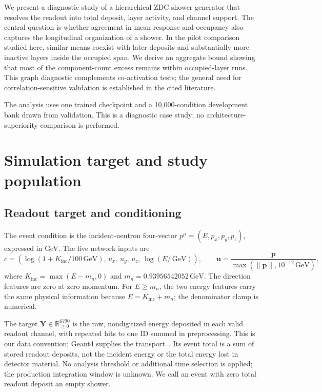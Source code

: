 \documentclass[11pt]{article}
\newcommand{\GeV}{\,\mathrm{GeV}}
\newcommand{\Kinc}{K_{\mathrm{inc}}}
\newcommand{\Y}{\mathbf{Y}}
\begin{document}
We present a diagnostic study of a hierarchical ZDC shower generator that resolves the readout into total deposit, layer activity, and channel support. The central question is whether agreement in mean response and occupancy also captures the longitudinal organization of a shower. In the pilot comparison studied here, similar means coexist with later deposits and substantially more inactive layers inside the occupied span. We derive an aggregate bound showing that most of the component-count excess remains within occupied-layer runs. This graph diagnostic complements co-activation tests; the general need for correlation-sensitive validation is established in the cited literature.

The analysis uses one trained checkpoint and a 10,000-condition development bank drawn from validation. This is a diagnostic case study; no architecture-superiority comparison is performed.

\section{Simulation target and study population}
\label{sec:data}

\subsection{Readout target and conditioning}

The event condition is the incident-neutron four-vector $p^\mu=(E,p_x,p_y,p_z)$, expressed in GeV. The five network inputs are
\begin{equation}
 c=\left(\log(1+\Kinc/100\GeV),\,u_x,\,u_y,\,u_z,\,\log(E/\GeV)\right),
 \qquad \mathbf u=\frac{\mathbf p}{\max(\lVert\mathbf p\rVert,10^{-12}\GeV)},
 \label{eq:condition}
\end{equation}
where $\Kinc=\max(E-m_n,0)$ and $m_n=0.93956542052\GeV$. The direction features are zero at zero momentum. For $E\geq m_n$, the two energy features carry the same physical information because $E=\Kinc+m_n$; the denominator clamp is numerical.

The target $\Y\in\mathbb R_{\geq0}^{6790}$ is the raw, nondigitized energy deposited in each valid readout channel, with repeated hits to one ID summed in preprocessing. This is our data convention; Geant4 supplies the transport~\cite{geant4}. Its event total is a sum of stored readout deposits, not the incident energy or the total energy lost in detector material. No analysis threshold or additional time selection is applied; the production integration window is unknown. We call an event with zero total readout deposit an empty shower.
\end{document}
